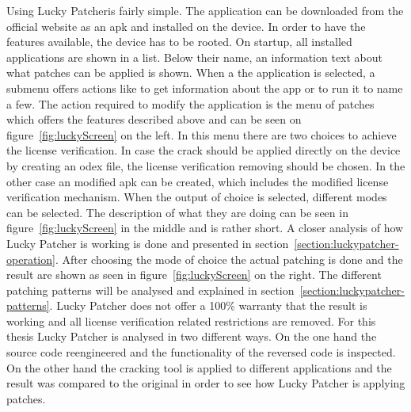 Using Lucky Patcheris fairly simple.
The application can be downloaded from the official website \cite{luckyPatcherOfficial} as an \gls{apk} and installed on the device.
In order to have the features available, the device has to be rooted.
On startup, all installed applications are shown in a list.
Below their name, an information text about what patches can be applied is shown.
When a the application is selected, a submenu offers actions like to get information about the app or to run it to name a few.
The action required to modify the application is the menu of patches which offers the features described above and can be seen on figure~\ref{fig:luckyScreen} on the left.
In this menu there are two choices to achieve the license verification.
In case the crack should be applied directly on the device by creating an odex file, the license verification removing should be chosen.
In the other case an modified apk can be created, which  includes the modified license verification mechanism.
When the output of choice is selected, different modes can be selected.
The description of what they are doing can be seen in figure~\ref{fig:luckyScreen} in the middle and is rather short.
A closer analysis of how Lucky Patcher is working is done and presented in section~\ref{section:luckypatcher-operation}.
After choosing the mode of choice the actual patching is done and the result are shown as seen in figure~\ref{fig:luckyScreen} on the right.
The different patching patterns will be analysed and explained in section~\ref{section:luckypatcher-patterns}.
Lucky Patcher does not offer a 100\% warranty that the result is working and all license verification related restrictions are removed.
\newline
For this thesis Lucky Patcher is analysed in two different ways.
On the one hand the source code reengineered and the functionality of the reversed code is inspected.
On the other hand the cracking tool is applied to different applications and the result was compared to the original in order to see how Lucky Patcher is applying patches.


